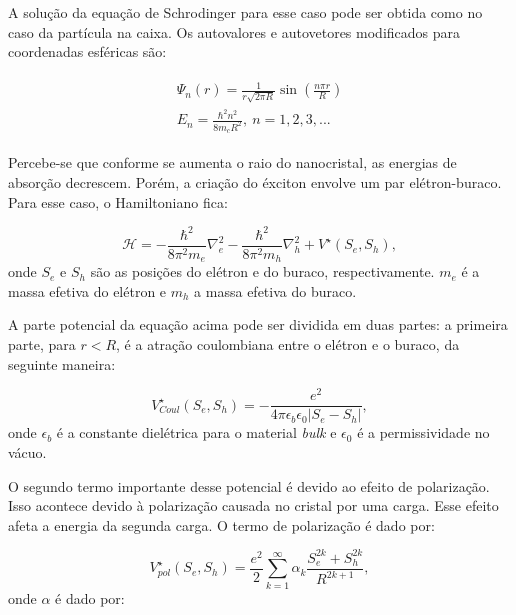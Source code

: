 \par A solução da equação de Schrodinger para esse caso pode ser obtida como no caso da partícula na caixa. Os autovalores e autovetores modificados para coordenadas esféricas são: 

\begin{align}
	\label{confinamento_10}
      \begin{array}{ll}
        \displaystyle \Psi_n(r) = \frac{1}{r\sqrt{2\pi R}}\sin\left(\frac{n\pi r}{R}\right)\\
        \displaystyle E_{n} = \frac{\hbar^2 n^2}{8m_{c}R^2},\ n=1,2,3,...
      \end{array}
\end{align}

\par Percebe-se que conforme se aumenta o raio do nanocristal, as energias de absorção decrescem.
Porém, a criação do éxciton envolve um par elétron-buraco. Para esse caso, o Hamiltoniano fica:

\begin{equation}
	\label{confinamento_11}
	\mathcal{H} = -\frac{\hbar^2}{8\pi^2 m_{e}}\nabla^2_{e} - \frac{\hbar^2}{8\pi^2 m_{h}}\nabla^2_{h}
		+ V^{\star}(S_{e}, S_{h}),
\end{equation}
onde $S_{e}$ e $S_{h}$ são as posições do elétron e do buraco, respectivamente. $m_{e}$ é a massa efetiva do elétron e $m_{h}$ a massa efetiva do buraco.

\par A parte potencial da equação acima pode ser dividida em duas partes: a primeira parte, para $r<R$, é a atração coulombiana entre o elétron e o buraco, da seguinte maneira:

\begin{equation}
	\label{confinamento_12}
	V^{\star}_{Coul}(S_{e}, S_{h}) = -\frac{e^2}{4\pi\epsilon_{b}\epsilon_{0}|S_{e} - S_{h}|},
\end{equation}
onde $\epsilon_{b}$ é a constante dielétrica para o material \textit{bulk} e $\epsilon_{0}$ é a permissividade no vácuo.

\par O segundo termo importante desse potencial é devido ao efeito de polarização. Isso acontece devido à polarização causada no cristal por uma carga. Esse efeito afeta a energia da segunda carga. O termo de polarização é dado por:

\begin{equation}
	\label{confinamento_13}
	V^{\star}_{pol}(S_{e}, S_{h}) = \frac{e^2}{2} \sum_{k=1}^{\infty} \alpha_{k}
		\frac{S_{e}^{2k} + S_{h}^{2k}}{R^{2k+1}},
\end{equation}
onde $\alpha$ é dado por:

